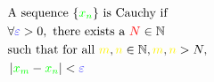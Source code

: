 \documentclass[preview]{standalone}
\begin{document}
\begin{align*}
\begin{aligned}&\text{A sequence } \{ \textcolor{green}{x_n} \} \text{ is Cauchy if } \\& \forall \textcolor{blue}{\varepsilon} > 0, \text{ there exists a } \textcolor{red}{N} \in \mathbb{N} \\& \text{such that for all } \textcolor{yellow}{m}, \textcolor{yellow}{n} \in \mathbb{N}, \textcolor{yellow}{m}, \textcolor{yellow}{n} > N, \\& \left|\textcolor{green}{x_m} - \textcolor{green}{x_n} \right| < \textcolor{blue}{\varepsilon} \end{aligned}
\end{align*}
\end{document}
